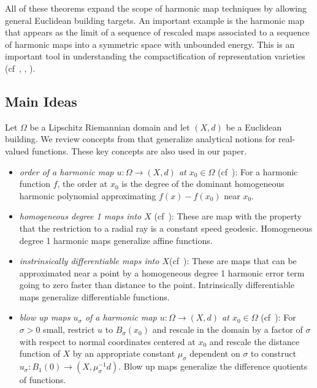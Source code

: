 \documentclass[12pt]{amsart}
\theoremstyle{definition}
\numberwithin{equation}{section}
\begin{document}
All of these theorems expand the scope of harmonic map techniques by allowing general Euclidean building targets.  An important example is   the harmonic map  that appears as the limit of a sequence of rescaled maps associated to a sequence of harmonic maps into a symmetric space with unbounded energy.  This is an   important tool in understanding the compactification of representation varieties (cf~\cite{wolf}, \cite{ddw},  
\cite{loftin-tamburelli-wolf}).


\subsection{Main Ideas}








Let $\Omega$ be a Lipschitz Riemannian domain and let $(X,d)$ be a Euclidean building.  We review concepts from \cite{gromov-schoen} that generalize analytical notions for real-valued functions.  These key concepts are also used in our paper.
\begin{itemize}
\item
{\it order of a harmonic map $u:\Omega \rightarrow (X,d)$ at $x_0 \in \Omega$} (cf~\cite[Section 2]{gromov-schoen}): For a harmonic function $f$, the order  at $x_0$ is the degree of the dominant homogeneous harmonic polynomial approximating $f(x)-f(x_0)$ near $x_0$.   
\item    {\it homogeneous degree 1 maps into $X$} (cf~\cite[Section 3]{gromov-schoen}): These are map with the property  that the restriction  to a radial ray   is a constant speed geodesic.   Homogeneous degree 1 harmonic maps generalize affine functions.  
\item  {\it instrinsically differentiable maps into $X$}(cf~\cite[Section 5]{gromov-schoen}):    These are maps that can be approximated near a point  by a homogeneous degree 1 harmonic error term going to zero faster than distance to the point.  Intrinsically differentiable maps generalize differentiable functions.  
\item {\it blow up maps $u_\sigma$ of a harmonic map $u:\Omega \rightarrow (X,d)$ at $x_0 \in \Omega$} (cf~\cite[Section 3]{gromov-schoen}):  For $\sigma>0$ small, restrict $u$ to $B_\sigma(x_0)$ and rescale in the domain by a factor of $\sigma$ with respect to normal coordinates centered at $x_0$ and rescale the distance function of $X$ by an appropriate constant $\mu_\sigma$ dependent on $\sigma$ to construct  $u_\sigma:B_1(0) \rightarrow (X,\mu_\sigma^{-1} d)$.  Blow up maps generalize the difference quotients of functions.
\end{itemize}
\end{document}
